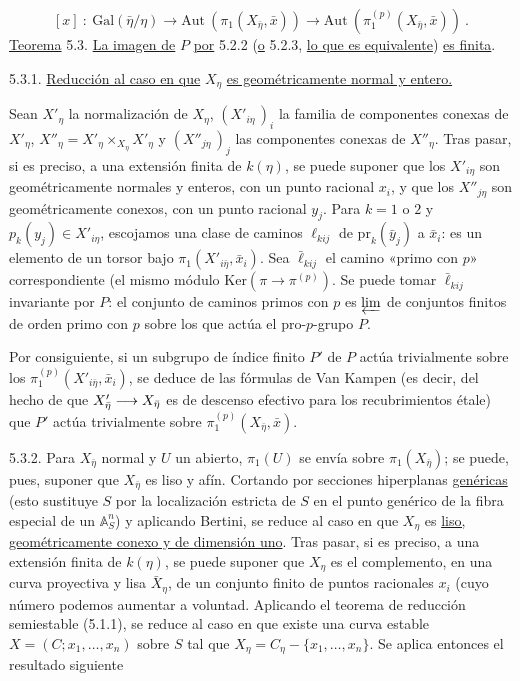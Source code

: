
\begin{equation}\tag{5.2.3}
[x] \ : \ \mathrm{Gal}(\bar{\eta}/\eta) \longrightarrow \mathrm{Aut}\ (\pi_1(X_{\bar{\eta}},\bar{x})) \longrightarrow \mathrm{Aut}\ (\pi_1^{(p)}(X_{\bar{\eta}},\bar{x}))\ .
\end{equation}
\underline{Teorema} 5.3. \underline{La imagen de} $P$ \underline{por} 5.2.2 (\underline{o} 5.2.3, \underline{lo que es equivalente}) \underline{es finita}.


5.3.1. \underline{Reducción al caso en que} $X_\eta$ \underline{es geométricamente normal y entero.}

Sean $X'_\eta$ la normalización de $X_\eta$, $(X'_{i\eta}\,)_i$ la familia de componentes conexas de $X'_\eta$, $X''_\eta = X'_\eta \times_{X_\eta} X'_\eta$ y $(X''_{j\eta}\,)_j$ las componentes conexas de $X''_\eta$. Tras pasar, si es preciso, a una extensión finita de $k(\eta)$, se puede suponer que los $X'_{i\eta}$ son geométricamente normales y enteros, con un punto racional $x_i$, y que los $X''_{j\eta}$ son geométricamente conexos, con un punto racional $y_j$. Para $k = 1$ o $2$ y $p_k(y_j) \in X'_{i\eta}$, escojamos una clase de caminos $\ell_{kij}$ de $\mathrm{pr}_k(\bar{y}_j)$ a $\bar{x}_i$: es un elemento de un torsor bajo $\pi_1(X'_{i\bar{\eta}},\bar{x}_i)$. Sea $\bar{\ell}_{kij}$ el camino «primo con $p$» correspondiente (el mismo módulo $\mathrm{Ker}(\pi \longrightarrow \pi^{(p)})$\sisi{}{)}. Se puede tomar $\bar{\ell}_{kij}$ invariante por $P$: el conjunto de caminos primos con $p$ es $\varprojlim$ de conjuntos finitos de orden primo con $p$ sobre los que actúa el pro-$p$-grupo $P$.

Por consiguiente, si un subgrupo de índice finito $P'$ de $P$ actúa trivialmente sobre los $\pi_1^{(p)}(X'_{i\bar{\eta}},\bar{x}_i)$, se deduce de las fórmulas de Van Kampen (es decir, del hecho de que $\sisi{X'_{i\bar{\eta}} \longrightarrow X_{i\bar{\eta}}}{X'_{\bar{\eta}} \longrightarrow X_{\bar{\eta}}}$ es de descenso efectivo para los recubrimientos étale) que $P'$ actúa trivialmente sobre $\pi_1^{(p)}(X_{\bar{\eta}},\bar{x})$.

5.3.2. Para $X_{\bar{\eta}}$ normal y $U$ un abierto, $\pi_1(U)$ se envía sobre $\pi_1(X_{\bar{\eta}})$; se puede, pues, suponer que $X_{\bar{\eta}}$ es liso y afín. Cortando por secciones hiperplanas \underline{genéricas} (esto sustituye $S$ por la localización estricta de $S$ en el punto genérico de la fibra especial de un $\mathbb{A}^n_S$) y aplicando Bertini, se reduce al caso en que $X_\eta$ es \underline{liso, geométricamente conexo y de dimensión uno}. Tras pasar, si es preciso, a una extensión finita de $k(\eta)$, se puede suponer que $X_\eta$ es el complemento, en una curva proyectiva y lisa $\bar{X}_\eta$, de un conjunto finito de puntos racionales $x_i$ (cuyo número podemos aumentar a voluntad\sisi{}{)}. Aplicando el teorema de reducción semiestable (5.1.1), se reduce al caso en que existe una curva estable $X = (C ; x_1 ,\ldots, x_n)$ sobre $S$ tal que $X_\eta = C_\eta - \{x_1 ,\ldots, x_n\}$. Se aplica entonces el resultado siguiente


